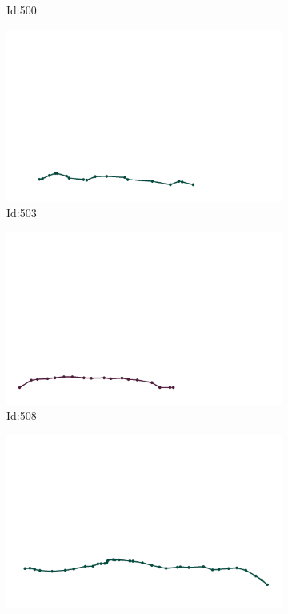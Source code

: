 \documentclass[12pt,twoside]{report}
\begin{document}
\begin{figure}
\begin{subfigure}[b]{0.20\textwidth}
\caption{Id:500}
\end{subfigure}
\begin{subfigure}[b]{0.20\textwidth}
\centering
\includegraphics[width=\textwidth]{../trajectories/503.png}
\caption{Id:503}
\end{subfigure}
\begin{subfigure}[b]{0.20\textwidth}
\centering
\includegraphics[width=\textwidth]{../trajectories/508.png}
\caption{Id:508}
\end{subfigure}
\begin{subfigure}[b]{0.20\textwidth}
\centering
\includegraphics[width=\textwidth]{../trajectories/552.png}

\end{subfigure}
\end{figure}
\end{document}
